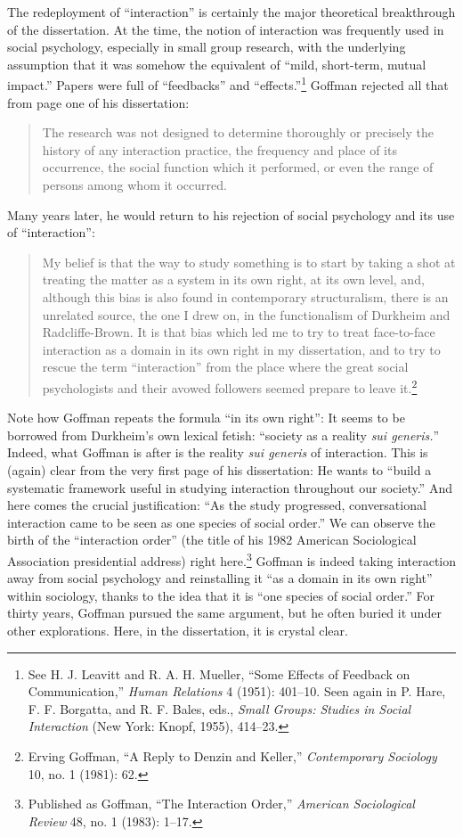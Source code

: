\documentclass[twoside,symmetric,nobib,justified]{tufte-book}
\begin{document}
The redeployment of ``interaction'' is certainly the major theoretical
breakthrough of the dissertation. At the time, the notion of interaction
was frequently used in social psychology, especially in small group
research, with the underlying assumption that it was somehow the
equivalent of ``mild, short-term, mutual impact.'' Papers were full of
``feedbacks'' and ``effects.''\footnote{See H. J. Leavitt and R. A. H.
  Mueller, ``Some Effects of Feedback on Communication,'' \emph{Human
  Relations} 4 (1951): 401--10. Seen again in P. Hare, F. F. Borgatta,
  and R. F. Bales, eds., \emph{Small Groups: Studies in Social
  Interaction} (New York: Knopf, 1955), 414--23.} Goffman rejected all
that from page one of his dissertation:

\begin{quote}
The research was not designed to determine thoroughly or precisely the
history of any interaction practice, the frequency and place of its
occurrence, the social function which it performed, or even the range of
persons among whom it occurred.
\end{quote}

\noindent Many years later, he would return to his rejection of social psychology
and its use of ``interaction'':

\begin{quote}
My belief is that the way to study something is to start by taking a
shot at treating the matter as a system in its own right, at its own
level, and, although this bias is also found in contemporary
structuralism, there is an unrelated source, the one I drew on, in the
functionalism of Durkheim and Radcliffe-Brown. It is that bias which led
me to try to treat face-to-face interaction as a domain in its own right
in my dissertation, and to try to rescue the term ``interaction'' from
the place where the great social psychologists and their avowed
followers seemed prepare to leave it.\footnote{Erving Goffman, ``A Reply
  to Denzin and Keller,'' \emph{Contemporary Sociology} 10, no. 1
  (1981): 62.}
\end{quote}

\noindent Note how Goffman repeats the formula ``in its own right'': It seems to
be borrowed from Durkheim's own lexical fetish: ``society as a reality
\emph{sui generis.}'' Indeed, what Goffman is after is the reality
\emph{sui generis} of interaction. This is (again) clear from the very
first page of his dissertation: He wants to ``build a systematic
framework useful in studying interaction throughout our society.'' And
here comes the crucial justification: ``As the study progressed,
conversational interaction came to be seen as one species of social
order.'' We can observe the birth of the ``interaction order'' (the
title of his 1982 American Sociological Association presidential
address) right here.\footnote{Published as Goffman, ``The Interaction
  Order,'' \emph{American Sociological Review} 48, no. 1 (1983): 1--17.}
Goffman is indeed taking interaction away from social psychology and
reinstalling it ``as a domain in its own right'' within sociology,
thanks to the idea that it is ``one species of social order.'' For
thirty years, Goffman pursued the same argument, but he often buried it
under other explorations. Here, in the dissertation, it is crystal
clear.
\end{document}
